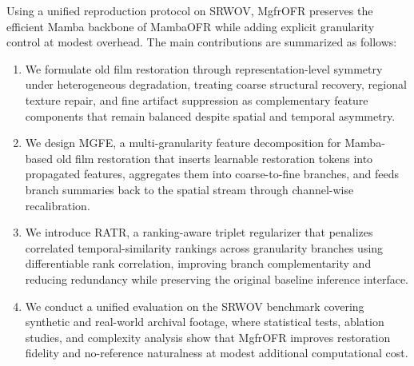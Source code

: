 Using a unified reproduction protocol on SRWOV, MgfrOFR preserves the efficient Mamba backbone of MambaOFR while adding explicit granularity control at modest overhead. The main contributions are summarized as follows:
\begin{enumerate}
    \item We formulate old film restoration through representation-level symmetry under heterogeneous degradation, treating coarse structural recovery, regional texture repair, and fine artifact suppression as complementary feature components that remain balanced despite spatial and temporal asymmetry.
    \item We design MGFE, a multi-granularity feature decomposition for Mamba-based old film restoration that inserts learnable restoration tokens into propagated features, aggregates them into coarse-to-fine branches, and feeds branch summaries back to the spatial stream through channel-wise recalibration.
    \item We introduce RATR, a ranking-aware triplet regularizer that penalizes correlated temporal-similarity rankings across granularity branches using differentiable rank correlation, improving branch complementarity and reducing redundancy while preserving the original baseline inference interface.
    \item We conduct a unified evaluation on the SRWOV benchmark covering synthetic and real-world archival footage, where statistical tests, ablation studies, and complexity analysis show that MgfrOFR improves restoration fidelity and no-reference naturalness at modest additional computational cost.
\end{enumerate}
